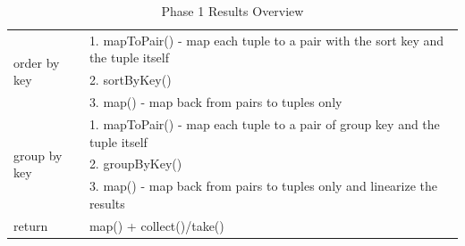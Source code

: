 \begin{table}[h!]
{\begin{tabular}{|l|l|}
			\multirow{3}{*}{order by key}                           & 1. mapToPair() - map each tuple to a pair with the sort key and the tuple itself                                                                                               \\ \cline{2-2} 
			& 2. sortByKey()                                                                                                                                                                 \\ \cline{2-2} 
			& 3. map() - map back from pairs to tuples only                                                                                                                                  \\ \hline
			\multirow{3}{*}{group by key}                           & 1. mapToPair() - map each tuple to a pair of group key and the tuple itself                                                                                                    \\ \cline{2-2} 
			& 2. groupByKey()                                                                                                                                                                \\ \cline{2-2} 
			& 3. map() - map back from pairs to tuples only and linearize the results                                                                                                        \\ \hline
			return                                                  & map() + collect()/take()                                                                                                                                                       \\ \hline
		\end{tabular}%
	}
	\caption{Phase 1 Results Overview}
	\label{tab:ClausesMapping}
\end{table}

